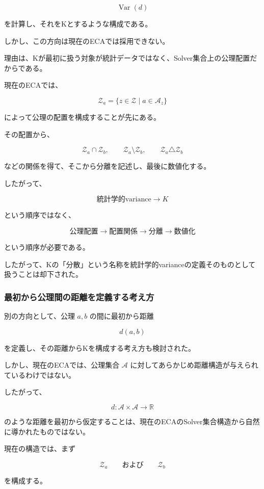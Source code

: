 \[
\operatorname{Var}(d)
\]

を計算し、それをKとするような構成である。

しかし、この方向は現在のECAでは採用できない。

理由は、Kが最初に扱う対象が統計データではなく、Solver集合上の公理配置だからである。

現在のECAでは、

\[
\mathcal{Z}_a = \{z\in\mathcal{Z}\mid a\in\mathcal{A}_z\}
\]

によって公理の配置を構成することが先にある。

その配置から、

\[
\mathcal{Z}_a\cap\mathcal{Z}_b,
\qquad
\mathcal{Z}_a\setminus\mathcal{Z}_b,
\qquad
\mathcal{Z}_a\triangle\mathcal{Z}_b
\]

などの関係を得て、そこから分離を記述し、最後に数値化する。

したがって、

\[
\text{統計学的variance}
\longrightarrow
K
\]

という順序ではなく、

\[
\text{公理配置}
\longrightarrow
\text{配置関係}
\longrightarrow
\text{分離}
\longrightarrow
\text{数値化}
\]

という順序が必要である。

したがって、Kの「分散」という名称を統計学的varianceの定義そのものとして扱うことは却下された。

\subsubsection{最初から公理間の距離を定義する考え方}

別の方向として、公理 $a,b$ の間に最初から距離

\[
d(a,b)
\]

を定義し、その距離からKを構成する考え方も検討された。

しかし、現在のECAでは、公理集合 $\mathcal{A}$ に対してあらかじめ距離構造が与えられているわけではない。

したがって、

\[
d:\mathcal{A}\times\mathcal{A}\longrightarrow\mathbb{R}
\]

のような距離を最初から仮定することは、現在のECAのSolver集合構造から自然に導かれたものではない。

現在の構造では、まず

\[
\mathcal{Z}_a
\qquad\text{および}\qquad
\mathcal{Z}_b
\]

を構成する。

